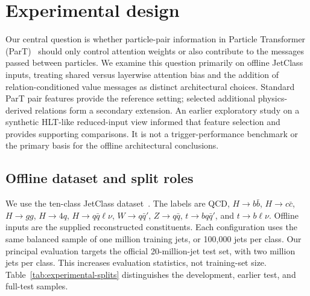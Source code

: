 \section{Experimental design}
\label{sec:experiments}

Our central question is whether particle-pair information in Particle
Transformer (ParT)~\cite{Qu:2022mxj} should only control attention weights
or also contribute to the messages passed between particles. We examine
this question primarily on offline JetClass inputs, treating shared versus
layerwise attention bias and the addition of relation-conditioned value
messages as distinct architectural choices. Standard ParT pair features
provide the reference setting; selected additional physics-derived
relations form a secondary extension. An earlier exploratory study on a
synthetic HLT-like reduced-input view informed that feature selection and
provides supporting comparisons. It is not a trigger-performance benchmark
or the primary basis for the offline architectural conclusions.

\subsection{Offline dataset and split roles}
\label{sec:experimental-data}

We use the ten-class JetClass dataset~\cite{Qu:2022mxj,JetClass}. The labels
are QCD, $H\to b\bar b$, $H\to c\bar c$, $H\to gg$, $H\to4q$,
$H\to q\bar q\ell\nu$, $W\to q\bar q'$, $Z\to q\bar q$,
$t\to bq\bar q'$, and $t\to b\ell\nu$. Offline inputs are the supplied
reconstructed constituents. Each configuration uses the same balanced
sample of one million training jets, or 100,000 jets per class. Our
principal evaluation targets the official 20-million-jet test set, with
two million jets per class. This increases evaluation statistics, not
training-set size. Table~\ref{tab:experimental-splits} distinguishes the
development, earlier test, and full-test samples.

